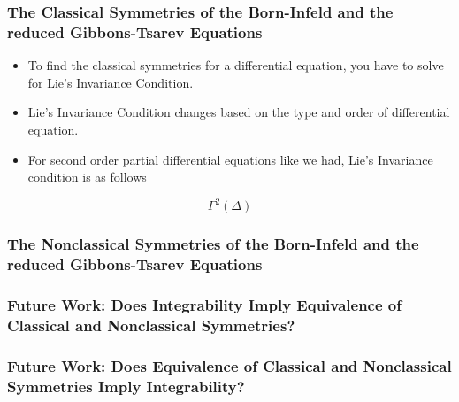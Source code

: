 \documentclass{beamer}
\begin{document}
\begin{frame}
    \frametitle{The Classical Symmetries of the Born-Infeld and the reduced Gibbons-Tsarev Equations}
    \begin{itemize}
        \item To find the classical symmetries for a differential equation, you have to solve for Lie's Invariance Condition.
        \item Lie's Invariance Condition changes based on the type and order of differential equation.
        \item For second order partial differential equations like we had, Lie's Invariance condition is as follows
    \end{itemize}
    \begin{Large}
        $$\Gamma^{2}(\Delta)$$
    \end{Large}
\end{frame}



\begin{frame}
    \frametitle{The Nonclassical Symmetries of the Born-Infeld and the reduced Gibbons-Tsarev Equations}

\end{frame}



\begin{frame}
    \frametitle{Future Work: Does Integrability Imply Equivalence of Classical and Nonclassical Symmetries?}

\end{frame}



\begin{frame}
    \frametitle{Future Work: Does Equivalence of Classical and Nonclassical Symmetries Imply Integrability?}

\end{frame}
\end{document}
